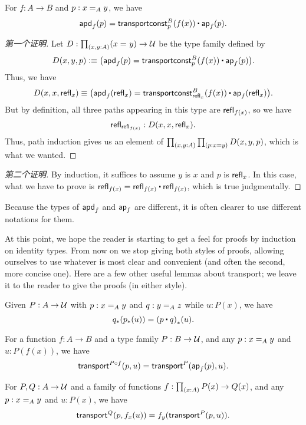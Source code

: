 \begin{lem}\label{thm:apd-const}
For $f:A\to B$ and $p:\id[A]xy$, we have
\[ \apdfunc f(p) = \transconst B p{f(x)} \ct \apfunc f (p). \]
\end{lem}
\begin{proof}[第一个证明]
Let $D:\prd{x,y:A} (\id xy) \to \type$ be the type family defined by
\[ D(x,y,p) \defeq \big(\apdfunc f (p) = \transconst Bp{f(x)} \ct \apfunc f (p)\big). \]
Thus, we have
\[D(x,x,\refl x) \jdeq \big(\apdfunc f (\refl x) = \transconst B{\refl x}{f(x)} \ct \apfunc f ({\refl x})\big).\]
But by definition, all three paths appearing in this type are $\refl{f(x)}$, so we have
\[ \refl{\refl{f(x)}} : D(x,x,\refl x). \]
Thus, path induction gives us an element of $\prd{x,y:A}{p:x=y} D(x,y,p)$, which is what we wanted.
\end{proof}
\begin{proof}[第二个证明]
By induction, it suffices to assume $y$ is $x$ and $p$ is $\refl x$.
In this case, what we have to prove is $\refl{f(x)} = \refl{f(x)} \ct \refl{f(x)}$, which is true judgmentally.
\end{proof}

Because the types of $\apdfunc{f}$ and $\apfunc{f}$ are different, it is often clearer to use different notations for them. %


%

At this point, we hope the reader is starting to get a feel for proofs by induction on identity types. From now on we stop giving both styles of proofs, allowing ourselves to use whatever is most clear and convenient (and often the second, more concise one). Here are a few other useful lemmas about transport; we leave it to the reader to give the proofs (in either style).

\begin{lem}\label{thm:transport-concat}
Given $P:A\to\type$ with $p:\id[A]xy$ and $q:\id[A]yz$ while $u:P(x)$, we have
\[ \trans{q}{\trans{p}{u}} = \trans{(p\ct q)}{u}. \]
\end{lem}

\begin{lem}\label{thm:transport-compose}
For a function $f:A\to B$ and a type family $P:B\to\type$, and any $p:\id[A]xy$ and $u:P(f(x))$, we have
\[ \transfib{P\circ f}{p}{u} = \transfib{P}{\apfunc f(p)}{u}. \]
\end{lem}

\begin{lem}\label{thm:ap-transport}
For $P,Q:A\to \type$ and a family of functions $f:\prd{x:A} P(x)\to Q(x)$, and any $p:\id[A]xy$ and $u:P(x)$, we have
\[ \transfib{Q}{p}{f_x(u)} = f_y(\transfib{P}{p}{u}). \]
\end{lem}

%
